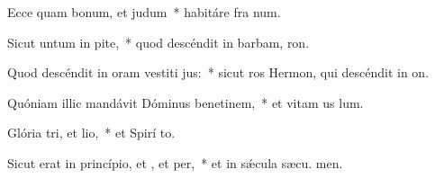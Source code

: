 \item Ecce quam bonum, et  judum~* habitáre fra  num.
\item Sicut untum in pite,~* quod descéndit in barbam,  ron.
\item Quod descéndit in oram vestiti jus:~* sicut ros Hermon, qui descéndit in  on.
\item Quóniam illic mandávit Dóminus benetinem,~* et vitam us  lum.
\item Glória tri, et lio,~* et Spirí to.
\item Sicut erat in princípio, et , et per,~* et in sǽcula sæcu. men.
